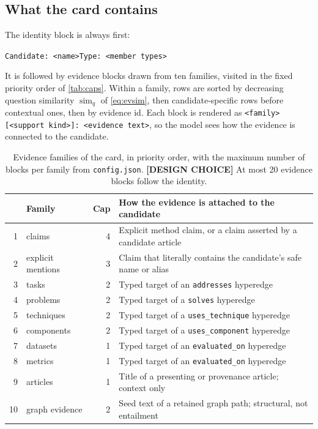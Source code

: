 \documentclass[11pt,a4paper]{article}
\newcommand{\cref}[1]{\autoref{#1}}
\theoremstyle{remark}
\newcommand{\code}[1]{\texttt{\small #1}}
\DeclareMathOperator{\simop}{sim}
\newcommand{\vtag}[2]{{\sffamily\scriptsize\bfseries\textcolor{#1}{[#2]}}}
\newcommand{\Dtag}{\vtag{black!60}{DESIGN CHOICE}}
\begin{document}
\subsection{What the card contains}

The identity block is always first:
\begin{center}
\code{Candidate: <name>}\quad\code{Type: <member types>}
\end{center}
It is followed by evidence blocks drawn from ten families, visited in the fixed priority
order of \cref{tab:caps}. Within a family, rows are sorted by decreasing question
similarity $\simop_q$ of \cref{eq:evsim}, then candidate-specific rows before contextual
ones, then by evidence id. Each block is rendered as
\code{<family> [<support kind>]: <evidence text>}, so the model sees how the evidence is
connected to the candidate.

\begin{table}[!htbp]
\centering
\caption[Evidence families and caps of the candidate card]{Evidence families of the card, in priority order, with the maximum number of
blocks per family from \code{config.json}. \Dtag{} At most 20 evidence blocks follow the
identity.}
\label{tab:caps}
\small
\begin{tabularx}{\linewidth}{rlrX}
\toprule
 & Family & Cap & How the evidence is attached to the candidate\\
\midrule
1 & claims & 4 & Explicit method claim, or a claim asserted by a candidate article\\
2 & explicit mentions & 3 & Claim that literally contains the candidate's safe name or alias\\
3 & tasks & 2 & Typed target of an \code{addresses} hyperedge\\
4 & problems & 2 & Typed target of a \code{solves} hyperedge\\
5 & techniques & 2 & Typed target of a \code{uses\_technique} hyperedge\\
6 & components & 2 & Typed target of a \code{uses\_component} hyperedge\\
7 & datasets & 1 & Typed target of an \code{evaluated\_on} hyperedge\\
8 & metrics & 1 & Typed target of an \code{evaluated\_on} hyperedge\\
9 & articles & 1 & Title of a presenting or provenance article; context only\\
10 & graph evidence & 2 & Seed text of a retained graph path; structural, not entailment\\
\bottomrule
\end{tabularx}
\end{table}
\end{document}
